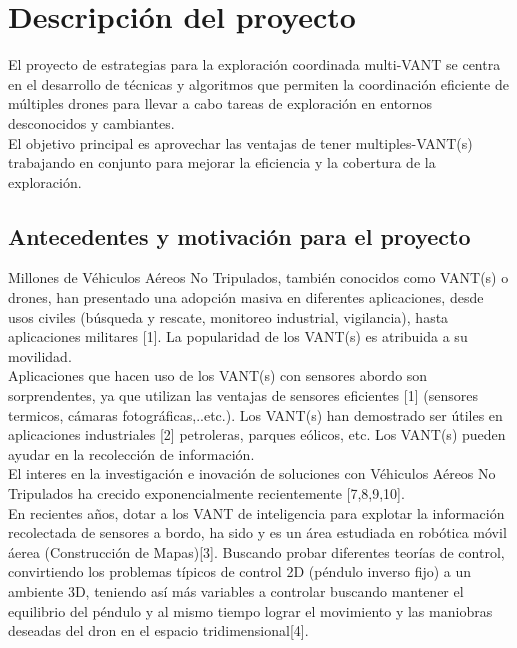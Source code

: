 \documentclass[11pt,epsf,times]{article}
\begin{document}
\newpage
\section{Descripci\'{o}n del proyecto}

El proyecto de estrategias para la exploración coordinada multi-VANT se centra en el desarrollo de técnicas y algoritmos que permiten la coordinación eficiente de múltiples drones para llevar a cabo tareas de exploración en entornos desconocidos y cambiantes. \\
El objetivo principal es aprovechar las ventajas de tener multiples-VANT(s) trabajando en conjunto para mejorar la eficiencia y la cobertura de la exploración.\\


\subsection{Antecedentes y motivaci\'{o}n para el proyecto}

Millones de Véhiculos Aéreos No Tripulados, también conocidos como VANT(s) o drones, han presentado una adopción masiva en diferentes aplicaciones, desde usos civiles (búsqueda y rescate, monitoreo industrial, vigilancia), hasta aplicaciones militares [1]. La popularidad de los VANT(s) es atribuida a su movilidad.\\

Aplicaciones que hacen uso de los VANT(s) con sensores abordo son sorprendentes, ya que utilizan las ventajas de sensores eficientes [1] (sensores termicos, cámaras fotográficas,..etc.). Los VANT(s) han demostrado ser útiles en aplicaciones industriales [2] petroleras, parques eólicos, etc. Los VANT(s) pueden ayudar en la recolección de información.\\

El interes en la investigación e inovación de soluciones con Véhiculos Aéreos No Tripulados ha crecido exponencialmente recientemente [7,8,9,10].\\

En recientes años, dotar a los VANT de inteligencia para explotar la información recolectada de sensores a bordo, ha sido y es un área estudiada en robótica móvil áerea (Construcción de Mapas)[3]. Buscando probar diferentes teorías de control, convirtiendo los problemas típicos de control 2D (péndulo inverso fijo) a un ambiente 3D, teniendo así más variables a controlar buscando mantener el equilibrio del péndulo y al mismo tiempo lograr el movimiento y las maniobras deseadas del dron en el espacio tridimensional[4].\\
\end{document}
